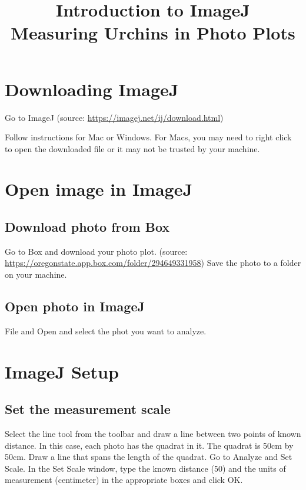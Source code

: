 \documentclass[12pt,letterpaper]{article}
\title{\textbf{Introduction to ImageJ}\\Measuring Urchins in Photo Plots}
\author{} %
\date{} %
\begin{document}
\maketitle

\tableofcontents

\pagebreak


\section{Downloading ImageJ}
\label{sec:download} %

Go to	{ImageJ (source: \url{https://imagej.net/ij/download.html})}

Follow instructions for Mac or Windows. For Macs, you may need to right click to open the downloaded file or it may not be trusted by your machine. 

\section{Open image in ImageJ}
\label{sec:open} %

\subsection{Download photo from Box}

Go to Box and download your photo plot.	{(source: \url{https://oregonstate.app.box.com/folder/294649331958})} Save the photo to a folder on your machine. 

\subsection{Open photo in ImageJ}

File and Open and select the phot you want to analyze. 


\section{ImageJ Setup}
\subsection{Set the measurement scale}

Select the line tool from the toolbar and draw a line between two points of known distance. In this case, each photo has the quadrat in it. The quadrat is 50cm by 50cm. Draw a line that spans the length of the quadrat. Go to Analyze and Set Scale. In the Set Scale window, type the known distance (50) and the units of measurement (centimeter) in the appropriate boxes and click OK.
\end{document}
